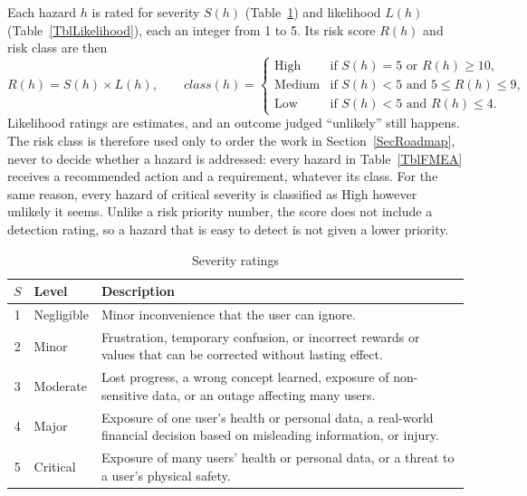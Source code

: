 \documentclass{article}
\begin{document}
Each hazard $h$ is rated for severity $S(h)$ (Table~\ref{TblSeverity}) and
likelihood $L(h)$ (Table~\ref{TblLikelihood}), each an integer from 1 to 5.
Its risk score $R(h)$ and risk class are then
\begin{equation} \label{EqRisk}
  R(h) = S(h) \times L(h), \qquad
  \mathit{class}(h) =
  \begin{cases}
    \text{High}   & \text{if } S(h) = 5 \text{ or } R(h) \geq 10,        \\
    \text{Medium} & \text{if } S(h) < 5 \text{ and } 5 \leq R(h) \leq 9, \\
    \text{Low}    & \text{if } S(h) < 5 \text{ and } R(h) \leq 4.
  \end{cases}
\end{equation}
Likelihood ratings are estimates, and an outcome judged ``unlikely'' still
happens. The risk class is therefore used only to order the work in
Section~\ref{SecRoadmap}, never to decide whether a hazard is addressed: every
hazard in Table~\ref{TblFMEA} receives a recommended action and a requirement,
whatever its class. For the same reason, every hazard of critical severity is
classified as High however unlikely it seems. Unlike a risk priority number,
the score does not include a detection rating, so a hazard that is easy to
detect is not given a lower priority.

\begin{table}[H]
  \caption{Severity ratings} \label{TblSeverity}
  \small
  \begin{tabularx}{\textwidth}{clX}
    \toprule
    \textbf{$S$} & \textbf{Level} & \textbf{Description}                                             \\
    \midrule
    1            & Negligible     & Minor inconvenience that the user can ignore.                    \\
    2            & Minor          & Frustration, temporary confusion, or incorrect rewards or values
    that can be corrected without lasting effect.                                                    \\
    3            & Moderate       & Lost progress, a wrong concept learned, exposure of
    non-sensitive data, or an outage affecting many users.                                           \\
    4            & Major          & Exposure of one user's health or personal data, a real-world
    financial decision based on misleading information, or injury.                                   \\
    5            & Critical       & Exposure of many users' health or personal data, or a threat to
    a user's physical safety.                                                                        \\
    \bottomrule
  \end{tabularx}
\end{table}
\end{document}
